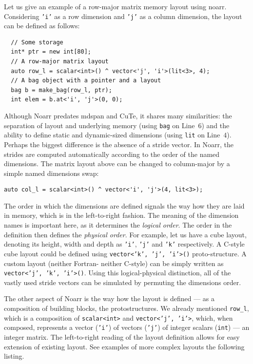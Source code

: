 Let us give an example of a row-major matrix memory layout using noarr. Considering \texttt{'i'} as a row dimension and \texttt{'j'} as a column dimension, the layout can be defined as follows:

\begin{verbatim}
  // Some storage
  int* ptr = new int[80];
  // A row-major matrix layout
  auto row_l = scalar<int>() ^ vector<'j', 'i'>(lit<3>, 4);
  // A bag object with a pointer and a layout
  bag b = make_bag(row_l, ptr);
  int elem = b.at<'i', 'j'>(0, 0);
\end{verbatim}

Although Noarr predates mdspan and CuTe, it shares many similarities: the separation of layout and underlying memory (using \texttt{bag} on Line~$6$) and the ability to define static and dynamic-sized dimensions (using \texttt{lit} on Line~$4$). Perhaps the biggest difference is the absence of a stride vector. In Noarr, the strides are computed automatically according to the order of the named dimensions. The matrix layout above can be changed to column-major by a simple named dimensions swap:
\begin{verbatim}
auto col_l = scalar<int>() ^ vector<'i', 'j'>(4, lit<3>);
\end{verbatim}
The order in which the dimensions are defined signals the way how they are laid in memory, which is in the left-to-right fashion. The meaning of the dimension names is important here, as it determines the \emph{logical order}. The order in the definition then defines the \emph{physical order}. For example, let us have a cube layout, denoting its height, width and depth as \texttt{'i'}, \texttt{'j'} and \texttt{'k'} respectively. A C-style cube layout could be defined using \texttt{vector<'k', 'j', 'i'>()} proto-structure. A custom layout (neither Fortran- neither C-style) can be simply written as \texttt{vector<'j', 'k', 'i'>()}. Using this logical-physical distinction, all of the vastly used stride vectors can be simulated by permuting the dimensions order.

The other aspect of Noarr is the way how the layout is defined --- as a composition of building blocks, the protostructures. We already mentioned \texttt{row\_l}, which is a composition of \texttt{scalar<int>} and \texttt{vector<'j', 'i'>}, which, when composed, represents a vector (\texttt{'i'}) of vectors (\texttt{'j'}) of integer scalars (\texttt{int}) --- an integer matrix. The left-to-right reading of the layout definition allows for easy extension of existing layout. See examples of more complex layouts the following listing.


